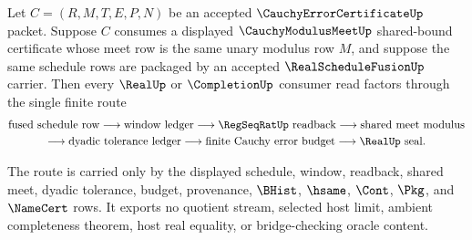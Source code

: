 \begin{theorem}
\label{thm:cauchy-error-certificate-schedule-fusion-shared-modulus-budget}
Let $C=(R,M,T,E,P,N)$ be an accepted $\CauchyErrorCertificateUp$ packet. Suppose $C$ consumes a displayed $\CauchyModulusMeetUp$ shared-bound certificate whose meet row is the same unary modulus row $M$, and suppose the same schedule rows are packaged by an accepted $\RealScheduleFusionUp$ carrier. Then every $\RealUp$ or $\CompletionUp$ consumer read factors through the single finite route
$$
\begin{gathered}
\text{fused schedule row}
\longrightarrow
\text{window ledger}
\longrightarrow
\RegSeqRatUp\text{ readback}
\longrightarrow
\text{shared meet modulus}
\\
\longrightarrow
\text{dyadic tolerance ledger}
\longrightarrow
\text{finite Cauchy error budget}
\longrightarrow
\RealUp\text{ seal}.
\end{gathered}
$$

The route is carried only by the displayed schedule, window, readback, shared meet, dyadic tolerance, budget, provenance, $\BHist$, $\hsame$, $\Cont$, $\Pkg$, and $\NameCert$ rows. It exports no quotient stream, selected host limit, ambient completeness theorem, host real equality, or bridge-checking oracle content.
\end{theorem}
